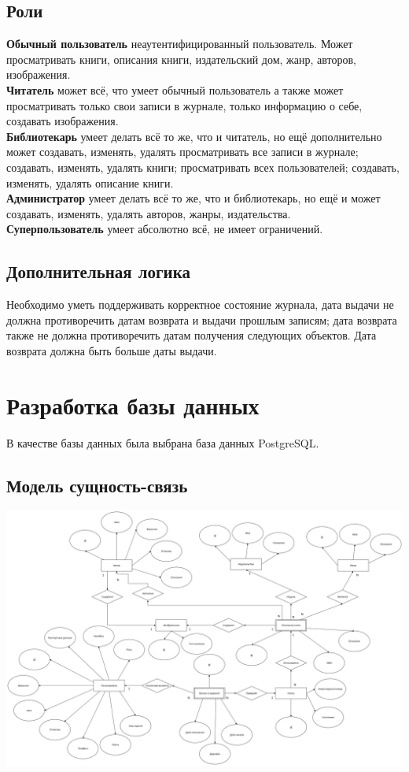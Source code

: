 \documentclass[a4paper,14pt]{extarticle}
\begin{document}
\subsection{Роли}
\textbf{Обычный пользователь} неаутентифицированный пользователь. 
Может просматривать книги, описания книги, издательский 
дом, жанр, авторов, изображения.\\
\textbf{Читатель} может всё, что умеет обычный пользователь а также может 
просматривать только свои записи в журнале, только информацию о себе, 
создавать изображения. \\
\textbf{Библиотекарь} умеет делать всё то же, что и читатель, но ещё дополнительно может
создавать, изменять, удалять просматривать все записи в журнале; создавать, изменять, удалять книги; 
просматривать всех пользователей; создавать, изменять, удалять описание книги. \\
\textbf{Администратор} умеет делать всё то же, что и библиотекарь, но ещё и может создавать, 
изменять, удалять авторов, жанры, издательства.\\
\textbf{Суперпользователь} умеет абсолютно всё, не имеет ограничений.\\

\subsection{Дополнительная логика}
Необходимо уметь поддерживать корректное состояние журнала, дата выдачи не должна противоречить
датам возврата и выдачи прошлым записям; дата возврата также не должна противоречить датам 
получения следующих объектов. Дата возврата должна быть больше даты выдачи.

\section{Разработка базы данных}
В качестве базы данных была выбрана база данных PostgreSQL. 
\subsection{Модель сущность-связь}
\includegraphics[width=140mm]{er.png}
\end{document}
